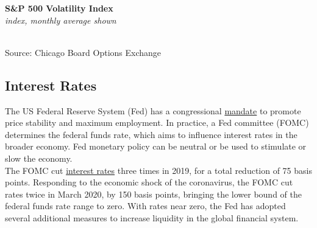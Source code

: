\documentclass{report}
\makeatletter
\newcommand{\tbllink}[1]{\href{https://raw.githubusercontent.com/bdecon/US-chartbook/master/chartbook/data/#1}{\faTable}}
\newcommand*\short[1]{\expandafter\@gobbletwo\number\numexpr#1\relax}
\newcommand{\dateaxisticks}{
		date coordinates in=x, axis line style={draw=none},
		xmax={2020-05-10},
		max space between ticks=40,	    
		xtick={{1990-01-01}, {1992-01-01}, {1994-01-01}, 
			{1996-01-01}, {1998-01-01}, {2000-01-01}, 
			{2002-01-01}, {2004-01-01}, {2006-01-01},
			{2008-01-01}, {2010-01-01}, {2012-01-01}, {2014-01-01},
		    {2016-01-01}, {2018-01-01}, {2020-01-01}},
		minor xtick={{1989-01-01}, {1991-01-01}, {1993-01-01},
			{1995-01-01}, {1997-01-01}, {1999-01-01}, 
			{2001-01-01}, {2003-01-01}, {2005-01-01}, {2007-01-01},
		    {2009-01-01}, {2011-01-01}, {2013-01-01}, {2015-01-01},
		    {2017-01-01}, {2019-01-01}},
		enlarge y limits={0.06}, enlarge x limits={0.01},
		}
\newcommand{\bbar}[2]{extra #1 ticks = {{#2}}, extra #1 tick labels = ,
		extra #1 tick style = {grid=major, grid style={thick, black!25}},}
\newcommand{\stdline}[4]{\addplot[very thick, no markers, color=#1] 
		table [x=#2, y=#3, col sep=comma] {#4};	}
\newcommand{\rbars}{
		\fill[color=black!10] (axis cs:{1990-07-01},\pgfkeysvalueof{/pgfplots/ymin}) rectangle 
			(axis cs:{1991-03-01}, \pgfkeysvalueof{/pgfplots/ymax});
		\fill[color=black!10] (axis cs:{2007-12-01},\pgfkeysvalueof{/pgfplots/ymin}) rectangle 
			(axis cs:{2009-07-01}, \pgfkeysvalueof{/pgfplots/ymax});
		\fill[color=black!10] (axis cs:{2001-03-01},\pgfkeysvalueof{/pgfplots/ymin}) rectangle 
			(axis cs:{2001-11-01}, \pgfkeysvalueof{/pgfplots/ymax});}
\makeatother
\begin{document}
{{{{{{{{{\begin{minipage}{0.76\textwidth}
\vspace{2mm}

\noindent \normalsize \textbf{S\&P 500 Volatility Index}\\
\footnotesize{\textit{index, monthly average shown}}\\ 
\noindent \hspace*{-2mm} \\
\footnotesize{Source: Chicago Board Options Exchange} \hfill \tbllink{vix.csv}
\end{minipage}

\newpage

\begin{minipage}{0.76\textwidth}

\subsection*{\color{black!70} \seriffont Interest Rates}

\small The US Federal Reserve System (Fed) has a congressional \href{https://www.federalreserve.gov/faqs/money_12848.htm}{mandate} to promote price stability and maximum employment. In practice, a Fed committee (FOMC) determines the federal funds rate, which aims to influence interest rates in the broader economy. Fed monetary policy can be neutral or be used to stimulate or slow the economy.\\

The FOMC cut \href{https://www.federalreserve.gov/releases/h15/}{interest rates} three times in 2019, for a total reduction of 75 basis points. Responding to the economic shock of the coronavirus, the FOMC cut rates twice in March 2020, by 150 basis points, bringing the lower bound of the federal funds rate range to zero. With rates near zero, the Fed has adopted several additional measures to increase liquidity in the global financial system.\\

\vspace{1mm}


\end{minipage}}}}}}}}}}
\end{document}
